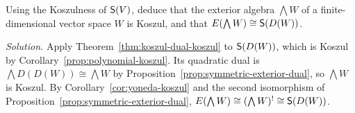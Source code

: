 \begin{exercise}
Using the Koszulness of $\mathsf{S}(V)$, deduce that the exterior algebra $\bigwedge W$ of a finite-dimensional vector space $W$ is Koszul, and that $E(\bigwedge W)\cong\mathsf{S}(D(W))$.
\end{exercise}

\begin{hidden}
\emph{Solution.}
Apply Theorem~\ref{thm:koszul-dual-koszul} to $\mathsf{S}(D(W))$, which is Koszul by Corollary~\ref{prop:polynomial-koszul}.
Its quadratic dual is $\bigwedge D(D(W))\cong\bigwedge W$ by Proposition~\ref{prop:symmetric-exterior-dual}, so $\bigwedge W$ is Koszul.
By Corollary~\ref{cor:yoneda-koszul} and the second isomorphism of Proposition~\ref{prop:symmetric-exterior-dual}, $E(\bigwedge W)\cong(\bigwedge W)^!\cong\mathsf{S}(D(W))$.
\end{hidden}

